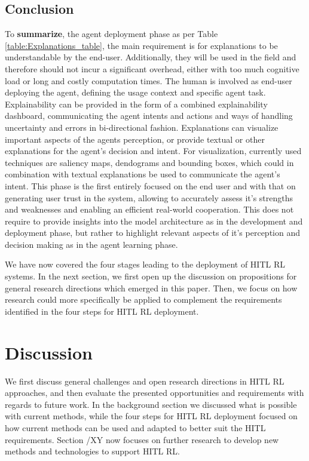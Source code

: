 \documentclass[twoside,11pt]{article}
\begin{document}
\begin{enumerate}
\subsection{Conclusion}

\noindent To \textbf{summarize}, the agent deployment phase as per Table \ref{table:Explanations_table}, the main requirement is for explanations to be understandable by the end-user. Additionally, they will be used in the field and therefore should not incur a significant overhead, either with  too much cognitive load or long and costly computation times. The human is involved as end-user deploying the agent, defining the usage context and specific agent task. Explainability can be provided in the form of a combined explainability dashboard, communicating the agent intents and actions and ways of handling uncertainty and errors in bi-directional fashion. Explanations can visualize important aspects of the agents perception, or provide textual or other explanations for the agent's decision and intent. For visualization, currently used techniques are saliency maps, dendograms and bounding boxes, which could in combination with textual explanations be used to communicate the agent's intent. This phase is the first entirely focused on the end user and with that on generating user trust in the system, allowing to accurately assess it's strengths and weaknesses and enabling an efficient real-world cooperation. This does not require to provide insights into the model architecture as in the development and deployment phase, but rather to highlight relevant aspects of it's perception and decision making as in the agent learning phase.

We have now covered the four stages leading to the deployment of HITL RL systems. In the next section, we first open up the discussion on propositions for general research directions which emerged in this paper. Then, we focus on how research could more specifically be applied to complement the requirements identified in the four steps for HITL RL deployment.

\section{Discussion}
\label{sec:discussion}
We first discuss general challenges and open research directions in HITL RL approaches, and then evaluate the presented opportunities and requirements  with regards to future work. In the background section we discussed what is possible with current methods, while the four steps for HITL RL deployment focused on how current methods can be used and adapted to better suit the HITL requirements. Section /XY now focuses on further research to develop new methods and technologies to support HITL RL.


\end{enumerate}
\end{document}
